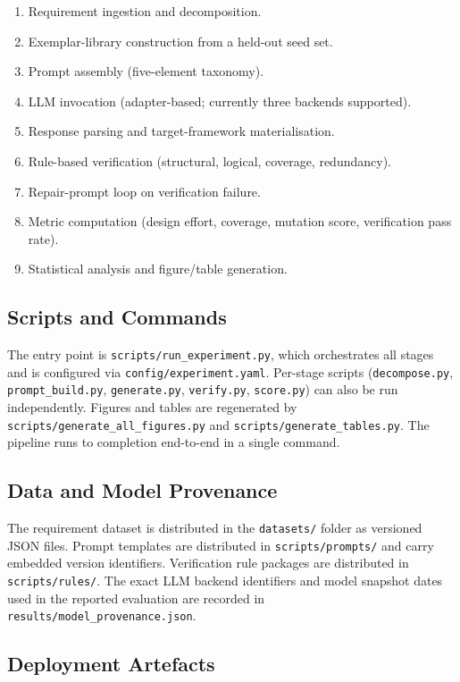 \documentclass[11pt,letterpaper]{article}
\begin{document}
\begin{enumerate}
\item Requirement ingestion and decomposition.
\item Exemplar-library construction from a held-out seed set.
\item Prompt assembly (five-element taxonomy).
\item LLM invocation (adapter-based; currently three backends supported).
\item Response parsing and target-framework materialisation.
\item Rule-based verification (structural, logical, coverage, redundancy).
\item Repair-prompt loop on verification failure.
\item Metric computation (design effort, coverage, mutation score, verification pass rate).
\item Statistical analysis and figure/table generation.
\end{enumerate}

\subsection{Scripts and Commands}

The entry point is \texttt{scripts/run\_experiment.py}, which orchestrates all stages and is configured via \texttt{config/experiment.yaml}. Per-stage scripts (\texttt{decompose.py}, \texttt{prompt\_build.py}, \texttt{generate.py}, \texttt{verify.py}, \texttt{score.py}) can also be run independently. Figures and tables are regenerated by \texttt{scripts/generate\_all\_figures.py} and \texttt{scripts/generate\_tables.py}. The pipeline runs to completion end-to-end in a single command.

\subsection{Data and Model Provenance}

The requirement dataset is distributed in the \texttt{datasets/} folder as versioned JSON files. Prompt templates are distributed in \texttt{scripts/prompts/} and carry embedded version identifiers. Verification rule packages are distributed in \texttt{scripts/rules/}. The exact LLM backend identifiers and model snapshot dates used in the reported evaluation are recorded in \texttt{results/model\_provenance.json}.

\subsection{Deployment Artefacts}
\end{document}
